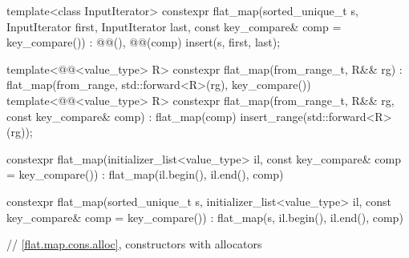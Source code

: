 \begin{codeblock}
{{    template<class InputIterator>
      constexpr flat_map(sorted_unique_t s, InputIterator first, InputIterator last,
                         const key_compare& comp = key_compare())
        : @@(), @@(comp) { insert(s, first, last); }

    template<@@<value_type> R>
      constexpr flat_map(from_range_t, R&& rg)
        : flat_map(from_range, std::forward<R>(rg), key_compare()) { }
    template<@@<value_type> R>
      constexpr flat_map(from_range_t, R&& rg, const key_compare& comp)
        : flat_map(comp) { insert_range(std::forward<R>(rg)); }

    constexpr flat_map(initializer_list<value_type> il, const key_compare& comp = key_compare())
        : flat_map(il.begin(), il.end(), comp) { }

    constexpr flat_map(sorted_unique_t s, initializer_list<value_type> il,
                       const key_compare& comp = key_compare())
        : flat_map(s, il.begin(), il.end(), comp) { }

    // \ref{flat.map.cons.alloc}, constructors with allocators

}}
\end{codeblock}
